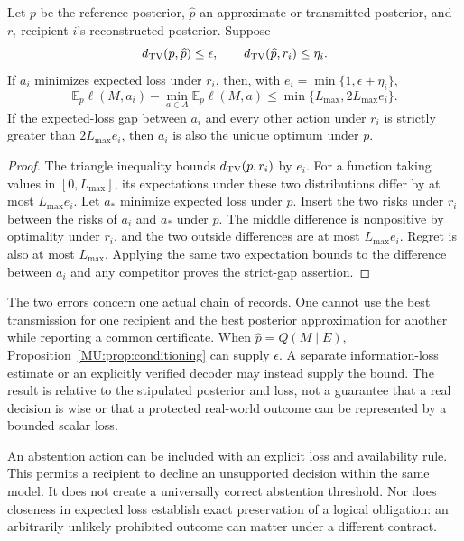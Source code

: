 \begin{MUproposition}\label{MU:prop:decision}
Let $p$ be the reference posterior, $\widehat p$ an approximate or transmitted posterior, and $r_i$ recipient $i$'s reconstructed posterior. Suppose
\[
d_{\mathrm{TV}}(p,\widehat p)\leq\epsilon,\qquad
d_{\mathrm{TV}}(\widehat p,r_i)\leq\eta_i.
\]
If $a_i$ minimizes expected loss under $r_i$, then, with $e_i=\min\{1,\epsilon+\eta_i\}$,
\begin{equation}\label{MU:eq:recipient-regret}
\mathbb E_p\ell(M,a_i)-\min_{a\in A}\mathbb E_p\ell(M,a)
\leq\min\{L_{\max},2L_{\max}e_i\}.
\end{equation}
If the expected-loss gap between $a_i$ and every other action under $r_i$ is strictly greater than $2L_{\max}e_i$, then $a_i$ is also the unique optimum under $p$.
\end{MUproposition}
\begin{proof}
The triangle inequality bounds $d_{\mathrm{TV}}(p,r_i)$ by $e_i$. For a function taking values in $[0,L_{\max}]$, its expectations under these two distributions differ by at most $L_{\max}e_i$. Let $a_*$ minimize expected loss under $p$. Insert the two risks under $r_i$ between the risks of $a_i$ and $a_*$ under $p$. The middle difference is nonpositive by optimality under $r_i$, and the two outside differences are at most $L_{\max}e_i$. Regret is also at most $L_{\max}$. Applying the same two expectation bounds to the difference between $a_i$ and any competitor proves the strict-gap assertion.
\end{proof}

The two errors concern one actual chain of records. One cannot use the best transmission for one recipient and the best posterior approximation for another while reporting a common certificate. When $\widehat p=Q(M\mid E)$, Proposition~\ref{MU:prop:conditioning} can supply $\epsilon$. A separate information-loss estimate or an explicitly verified decoder may instead supply the bound. The result is relative to the stipulated posterior and loss, not a guarantee that a real decision is wise or that a protected real-world outcome can be represented by a bounded scalar loss.

An abstention action can be included with an explicit loss and availability rule. This permits a recipient to decline an unsupported decision within the same model. It does not create a universally correct abstention threshold. Nor does closeness in expected loss establish exact preservation of a logical obligation: an arbitrarily unlikely prohibited outcome can matter under a different contract.

